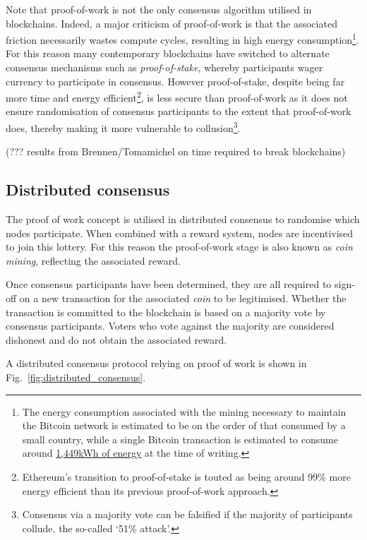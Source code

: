 Note that proof-of-work is not the only consensus algorithm utilised in blockchains. Indeed, a major criticism of proof-of-work is that the associated friction necessarily wastes compute cycles, resulting in high energy consumption\footnote{The energy consumption associated with the mining necessary to maintain the Bitcoin network is estimated to be on the order of that consumed by a small country, while a single Bitcoin transaction is estimated to consume around \href{https://www.cnet.com/personal-finance/crypto/bitcoin-mining-how-much-electricity-it-takes-and-why-people-are-worried/}{1,449kWh of energy} at the time of writing.}. For this reason many contemporary blockchains have switched to alternate consensus mechanisms such as \emph{proof-of-stake}, whereby participants wager currency to participate in consensus. However proof-of-stake, despite being far more time and energy efficient\footnote{Ethereum's transition to proof-of-stake is touted as being around 99\% more energy efficient than its previous proof-of-work approach.}, is less secure than proof-of-work as it does not ensure randomisation of consensus participants to the extent that proof-of-work does, thereby making it more vulnerable to collusion\footnote{Consensus via a majority vote can be falsified if the majority of participants collude, the so-called `51\% attack'.}.

(??? results from Brennen/Tomamichel on time required to break
blockchains)

\subsection{Distributed consensus}

The proof of work concept is utilised in distributed consensus to randomise which nodes participate. When combined with a reward system, nodes are incentivised to join this lottery. For this reason the proof-of-work stage is also known as \emph{coin mining}, reflecting the associated reward.

Once consensus participants have been determined, they are all required to sign-off on a new transaction for the associated \emph{coin} to be legitimised. Whether the transaction is committed to the blockchain is based on a majority vote by consensus participants. Voters who vote against the majority are considered dishonest and do not obtain the associated reward.

A distributed consensus protocol relying on proof of work is shown in Fig.~\ref{fig:distributed_consensus}.

